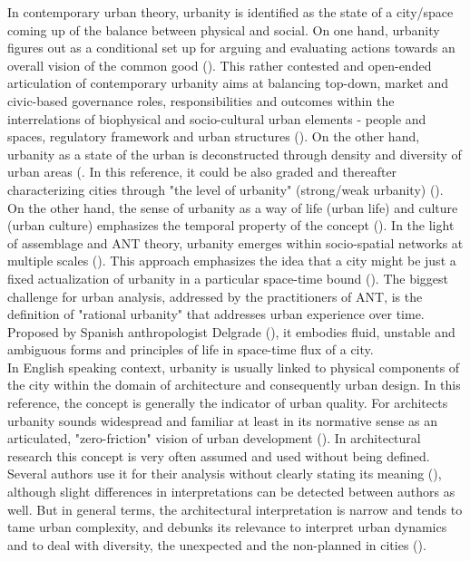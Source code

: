 \documentclass[11pt]{report}
\begin{document}
In contemporary urban theory, urbanity is identified as the state of a city/space coming up of the balance between physical and social.
On one hand, urbanity figures out as a conditional set up for arguing and evaluating actions towards an overall vision of the common good (\citealt{Holden et al., 2015}).
This rather contested and open-ended articulation of contemporary urbanity aims at balancing top-down, market and civic-based governance roles, responsibilities and outcomes within the interrelations of biophysical and socio-cultural urban elements - people and spaces, regulatory framework and urban structures (\citealt{(Groth and Corijn 2005, Tardin 2014, Holden et al 2015)}).
On the other hand, urbanity as a state of the urban is deconstructed through density and diversity of urban areas (\citealt{Lévy's (1997, 2003)}. In this reference, it could be also graded and thereafter characterizing cities through "the level of urbanity" (strong/weak urbanity) (\cite{Lévy 2013}).
\\

On the other hand, the sense of urbanity as a way of life (urban life) and culture (urban culture) emphasizes the temporal property of the concept (\cite{(Farias and Bender introduction)}).
In the light of assemblage and ANT theory, urbanity emerges within socio-spatial networks at multiple scales (\cite{(Kamalipour and Peimani 2015)}).
This approach emphasizes the idea that a city might be just a fixed actualization of urbanity in a particular space-time bound (\cite{(Farias and Bender:297)}).
The biggest challenge for urban analysis, addressed by the practitioners of ANT, is the definition of "rational urbanity" that addresses urban experience over time.
Proposed by Spanish anthropologist Delgrade (\citealt{(Farias and Bender p211)}), it embodies fluid, unstable and ambiguous forms and principles of life in space-time flux of a city.
\\

In English speaking context, urbanity is usually linked to physical components of the city within the domain of architecture and consequently urban design.
In this reference, the concept is generally the indicator of urban quality. For architects urbanity sounds widespread and familiar at least in its normative sense as an articulated, "zero-friction" vision of urban development (\citealt{Hajer 1999, Wüst 2005}).
In architectural research this concept is very often assumed and used without being defined.
Several authors use it for their analysis without clearly stating its meaning (\cite{(ref?????)}), although slight differences in interpretations can be detected between authors as well.
But in general terms, the architectural interpretation is narrow and tends to tame urban complexity, and debunks its relevance to interpret urban dynamics  and to deal with diversity, the unexpected and the non-planned in cities (\citealt{Groth and Corijn 2005, Wüst 2005}). 
\\
\end{document}
